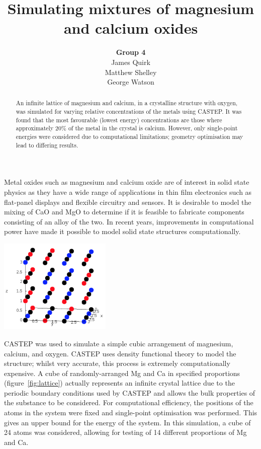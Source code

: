 \documentclass[a4paper,12pt]{article}
\title{Simulating mixtures of magnesium and calcium oxides}
\author{\textbf{Group 4}\\
	James Quirk\\
	Matthew Shelley\\
	George Watson}
\date{}
\begin{document}
\maketitle

\begin{abstract}
    An infinite lattice of magnesium and calcium, in a crystalline structure with oxygen, was simulated for varying relative concentrations of the metals using CASTEP. It was found that the most favourable (lowest energy) concentrations are those where approximately 20\% of the metal in the crystal is calcium. However, only single-point energies were considered due to computational limitations; geometry optimisation may lead to differing results.
\end{abstract}

\begin{multicols}{2}
	
	Metal oxides such as magnesium and calcium oxide are of interest in solid state physics as they have a wide range of applications in thin film electronics such as flat-panel displays and flexible circuitry and sensors.\cite{kim2011lowtemperature} It is desirable to model the mixing of CaO and MgO to determine if it is feasible to fabricate components consisting of an alloy of the two. In recent years, improvements in computational power have made it possible to model solid state structures computationally.
	\begin{center}
	    \includegraphics[keepaspectratio=true,width=0.4\textwidth]{lattice}
			\label{fig:lattice} 
	\end{center}
	CASTEP\cite{clark2009first} was used to simulate a simple cubic arrangement of magnesium, calcium, and oxygen. CASTEP uses density functional theory to model the structure; whilst very accurate, this process is extremely computationally expensive. A cube of randomly-arranged Mg and Ca in specified proportions (figure~\ref{fig:lattice}) actually represents an infinite crystal lattice due to the periodic boundary conditions used by CASTEP and allows the bulk properties of the substance to be considered. For computational efficiency, the positions of the atoms in the system were fixed and single-point optimisation was performed. This gives an upper bound for the energy of the system. In this simulation, a cube of 24 atoms was considered, allowing for testing of 14 different proportions of Mg and Ca. 
	

\end{multicols}
\end{document}

